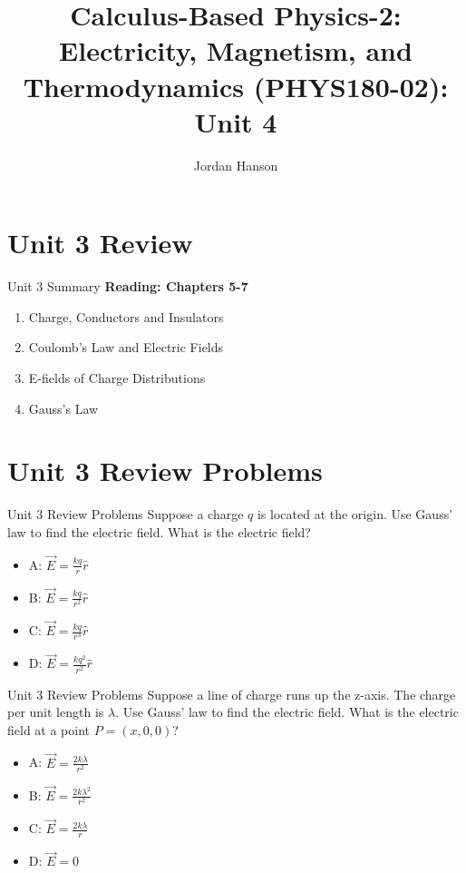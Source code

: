\documentclass{beamer}
\title{Calculus-Based Physics-2: Electricity, Magnetism, and Thermodynamics (PHYS180-02): Unit 4}
\author{Jordan Hanson}
\institute{Whittier College Department of Physics and Astronomy}
\begin{document}
\maketitle

\section{Unit 3 Review}

\begin{frame}{Unit 3 Summary}
\textbf{Reading: Chapters 5-7}
\begin{enumerate}
\item Charge, Conductors and Insulators
\item Coulomb's Law and Electric Fields
\item E-fields of Charge Distributions
\item Gauss's Law
\end{enumerate}
\end{frame}

\section{Unit 3 Review Problems}

\begin{frame}{Unit 3 Review Problems}
Suppose a charge $q$ is located at the origin.  Use Gauss' law to find the electric field.  What is the electric field?
\begin{itemize}
\item A: $\vec{E} = \frac{kq}{r}\hat{r}$
\item B: $\vec{E} = \frac{kq}{r^2}\hat{r}$
\item C: $\vec{E} = \frac{kq}{r^3}\hat{r}$
\item D: $\vec{E} = \frac{kq^2}{r^2}\hat{r}$
\end{itemize}
\end{frame}

\begin{frame}{Unit 3 Review Problems}
Suppose a line of charge runs up the z-axis.  The charge per unit length is $\lambda$.  Use Gauss' law to find the electric field.  What is the electric field at a point $P = (x,0,0)$?
\begin{itemize}
\item A: $\vec{E} = \frac{2k\lambda}{r^2}$
\item B: $\vec{E} = \frac{2k\lambda^2}{r^2}$
\item C: $\vec{E} = \frac{2k\lambda}{r}$
\item D: $\vec{E} = 0$
\end{itemize}
\end{frame}
\end{document}
